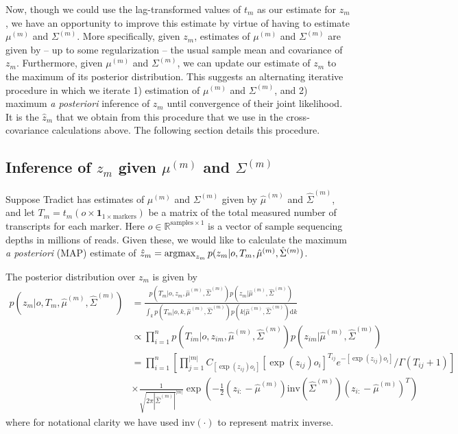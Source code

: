 \documentclass[10pt]{article}
\newcommand{\argmax}{\operatornamewithlimits{argmax}}
\begin{document}
Now, though we could use the lag-transformed values of $t_m$ as our estimate for $z_m$, we have an opportunity to improve this estimate by virtue of having to estimate $\mu^{(m)}$ and  $\Sigma^{(m)}$. More specifically, given $z_m$, estimates of $\mu^{(m)}$ and  $\Sigma^{(m)}$ are given by -- up to some regularization -- the usual sample mean and covariance of $z_m$. Furthermore, given $\mu^{(m)}$ and  $\Sigma^{(m)}$, we can update our estimate of $z_m$ to the maximum of its posterior distribution. This suggests an alternating iterative procedure in which we iterate 1) estimation of $\mu^{(m)}$ and  $\Sigma^{(m)}$, and 2) maximum \emph{a posteriori} inference of $z_m$ until convergence of their joint likelihood. It is the $\hat{z}_m$ that we obtain from this procedure that we use in the cross-covariance calculations above. The following section details this procedure.



\subsection{Inference of $z_m$ given $\mu^{(m)}$ and $\Sigma^{(m)}$}

Suppose Tradict has estimates of $\mu^{(m)}$ and $\Sigma^{(m)}$ given by $\hat{\mu}^{(m)}$ and $\hat{\Sigma}^{(m)}$, and let $T_m = t_m(o \times \textbf{1}_{1 \times \textrm{markers}} )$ be a matrix of the total measured number of transcripts for each marker. Here $o \in \mathbb{R}^{\textrm{samples} \times 1}$ is a vector of sample sequencing depths in millions of reads. Given these, we would like to calculate the maximum \emph{a posteriori} (MAP) estimate of $\hat{z}_m = \argmax_{z_m} p(z_m | o, T_m, \hat{\mu}^{(m)}, \hat{\Sigma}^{(m)}) $. 

The posterior distribution over $z_m$ is given by 
\begin{align*}
p(z_m| o, T_m, \hat{\mu}^{(m)}, \hat{\Sigma}^{(m)}) & =  \frac{p(T_m | o, z_m, \hat{\mu}^{(m)}, \hat{\Sigma}^{(m)}) p(z_m| \hat{\mu}^{(m)}, \hat{\Sigma}^{(m)}) }{ \int_k  p(T_m | o, k, \hat{\mu}^{(m)}, \hat{\Sigma}^{(m)}) p(k | \hat{\mu}^{(m)}, \hat{\Sigma}^{(m)}) \textrm{d}k } \\
& \propto \prod_{i=1}^{n}  p(T_{im} | o, z_{im}, \hat{\mu}^{(m)}, \hat{\Sigma}^{(m)}) p(z_{im}| \hat{\mu}^{(m)}, \hat{\Sigma}^{(m)}) \\
& = \prod_{i=1}^{n} \left[ \prod_{j=1}^{|m|} C_{[\exp(z_{ij})o_i]} [\exp(z_{ij})o_i]^{T_{ij}}  e^{-[\exp(z_{ij})o_i]} / \Gamma(T_{ij} + 1) \right] \\ 
& \times \frac{1}{\sqrt{2\pi|\hat{\Sigma}^{(m)}|}^{|m|}}\exp\left(-\frac{1}{2}(z_{i:}-\hat{\mu}^{(m)}) \textrm{inv}\left( \hat{\Sigma}^{(m)} \right)(z_{i:}-\hat{\mu}^{(m)})^T \right)
\end{align*}
where for notational clarity we have used $\textrm{inv}(\cdot)$ to represent matrix inverse. 
\end{document}
